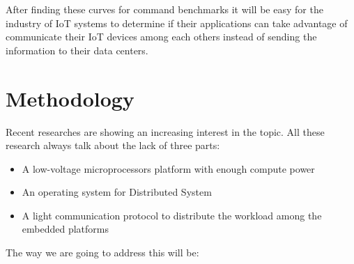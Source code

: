 After finding these curves for command benchmarks it will be easy for the
industry of IoT systems to determine if their applications can take advantage
of communicate their IoT devices among each others instead of sending the
information to their data centers.


\section{Methodology}
\noindent

Recent researches \cite{Saldana} \cite{Gallego} \cite{McMahon} \cite{Liu} are 
showing an increasing interest in the topic.  All these research always talk
about the lack of three parts: 

\begin{itemize}
\item A low-voltage microprocessors platform with enough compute power
\item An operating system for Distributed System
\item A light communication protocol to distribute the workload among the
embedded platforms
\end{itemize}

The way we are going to address this will be:


